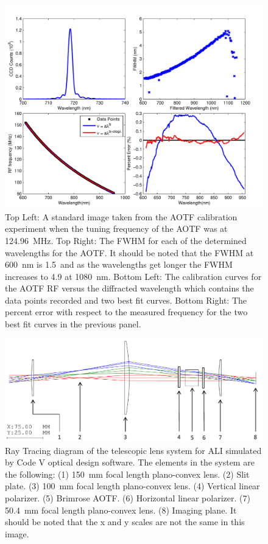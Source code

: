 \documentclass[12pt]{article}
\begin{document}
\begin{figure}
    \includegraphics[width=1.0\textwidth]{./Images/3-1-AOTFCharaterization.pdf}
    \caption{Top Left: A standard image taken from the AOTF calibration experiment when the tuning frequency of the AOTF was at 124.96~MHz. Top Right: The FWHM for each of the determined wavelengths for the AOTF. It should be noted that the FWHM at 600~nm is 1.5~and as the wavelengths get longer the FWHM increases to 4.9 at 1080~nm. Bottom Left: The calibration curves for the AOTF RF versus the  diffracted wavelength which contains the data points recorded and two best fit curves. Bottom Right: The percent error with respect to the measured frequency for the two best fit curves in the previous panel.}
    \label{fig:3.1:AOTFCharaterization}
\end{figure}

\newpage

\begin{figure}
    \includegraphics[width=1.0\textwidth]{./Images/3-2-TelescopicRayTracing.pdf}
    \caption{Ray Tracing diagram of the telescopic lens system for ALI simulated by Code V optical design software. The elements in the system are the following: (1) 150~mm focal length plano-convex lens. (2) Slit plate. (3) 100~mm focal length plano-convex lens. (4) Vertical linear polarizer. (5) Brimrose AOTF. (6) Horizontal linear polarizer. (7) 50.4~mm focal length plano-convex lens. (8) Imaging plane. It should be noted that the x and y scales are not the same in this image.}
    \label{fig:3.2:telescopicRayTracing}
\end{figure}
\end{document}
